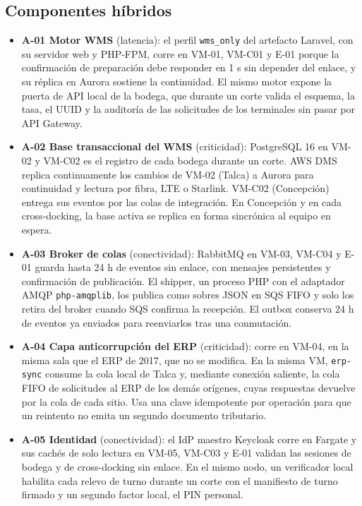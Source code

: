 \subsection*{Componentes híbridos}
\label{anx:X-hibridos}
\begin{itemize}
  \item \textbf{A-01 Motor WMS} (latencia): el perfil \texttt{wms\_only} del artefacto Laravel, con su servidor web y PHP-FPM, corre en VM-01, VM-C01 y E-01 porque la confirmación de preparación debe responder en 1 s sin depender del enlace, y su réplica en Aurora sostiene la continuidad. El mismo motor expone la puerta de API local de la bodega, que durante un corte valida el esquema, la tasa, el UUID y la auditoría de las solicitudes de los terminales sin pasar por API Gateway.
  \item \textbf{A-02 Base transaccional del WMS} (criticidad): PostgreSQL 16 en VM-02 y VM-C02 es el registro de cada bodega durante un corte. AWS DMS replica continuamente los cambios de VM-02 (Talca) a Aurora para continuidad y lectura por fibra, LTE o Starlink. VM-C02 (Concepción) entrega sus eventos por las colas de integración. En Concepción y en cada cross-docking, la base activa se replica en forma sincrónica al equipo en espera.
  \item \textbf{A-03 Broker de colas} (conectividad): RabbitMQ en VM-03, VM-C04 y E-01 guarda hasta 24 h de eventos sin enlace, con mensajes persistentes y confirmación de publicación. El shipper, un proceso PHP con el adaptador AMQP \texttt{php-amqplib}, los publica como sobres JSON en SQS FIFO y solo los retira del broker cuando SQS confirma la recepción. El outbox conserva 24 h de eventos ya enviados para reenviarlos tras una conmutación.
  \item \textbf{A-04 Capa anticorrupción del ERP} (criticidad): corre en VM-04, en la misma sala que el ERP de 2017, que no se modifica. En la misma VM, \texttt{erp-sync} consume la cola local de Talca y, mediante conexión saliente, la cola FIFO de solicitudes al ERP de los demás orígenes, cuyas respuestas devuelve por la cola de cada sitio. Usa una clave idempotente por operación para que un reintento no emita un segundo documento tributario.
  \item \textbf{A-05 Identidad} (conectividad): el IdP maestro Keycloak corre en Fargate y sus cachés de solo lectura en VM-05, VM-C03 y E-01 validan las sesiones de bodega y de cross-docking sin enlace. En el mismo nodo, un verificador local habilita cada relevo de turno durante un corte con el manifiesto de turno firmado y un segundo factor local, el PIN personal.

\end{itemize}

